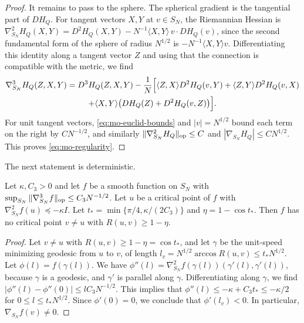 \begin{proof}
It remains to pass to the sphere. The spherical gradient is the tangential part of $DH_Q$. For tangent vectors $X,Y$ at $v\in S_N$, the Riemannian Hessian is $\nabla_{S_N}^2H_Q(X,Y)=D^2H_Q(X,Y)-N^{-1}\langle X,Y\rangle\,v\cdot DH_Q(v)$, since the second fundamental form of the sphere of radius $N^{1/2}$ is $-N^{-1}\langle X,Y\rangle v$. Differentiating this identity along a tangent vector $Z$ and using that the connection is compatible with the metric, we find
\begin{multline*}
\nabla_{S_N}^3H_Q(Z,X,Y)=D^3H_Q(Z,X,Y)-\frac1N\Bigl[\langle Z,X\rangle D^2H_Q(v,Y)+\langle Z,Y\rangle D^2H_Q(v,X)\\
+\langle X,Y\rangle\bigl(DH_Q(Z)+D^2H_Q(v,Z)\bigr)\Bigr].
\end{multline*}
For unit tangent vectors, \eqref{eq:mo-euclid-bounds} and $|v|=N^{1/2}$ bound each term on the right by $CN^{-1/2}$, and similarly $\|\nabla_{S_N}^2H_Q\|_{\rm op}\le C$ and $|\nabla_{S_N}H_Q|\le CN^{1/2}$. This proves \eqref{eq:mo-regularity}.
\end{proof}

The next statement is deterministic.

\begin{lemma}\label{lem:mo-geodesic}
Let $\kappa,C_3>0$ and let $f$ be a smooth function on $S_N$ with $\sup_{S_N}\|\nabla_{S_N}^3f\|_{\rm op}\le C_3N^{-1/2}$. Let $u$ be a critical point of $f$ with $\nabla_{S_N}^2f(u)\preceq-\kappa I$. Let $t_*=\min\{\pi/4,\kappa/(2C_3)\}$ and $\eta=1-\cos t_*$. Then $f$ has no critical point $v\ne u$ with $R(u,v)\ge1-\eta$.
\end{lemma}

\begin{proof}
Let $v\ne u$ with $R(u,v)\ge1-\eta=\cos t_*$, and let $\gamma$ be the unit-speed minimizing geodesic from $u$ to $v$, of length $l_v=N^{1/2}\arccos R(u,v)\le t_*N^{1/2}$. Let $\phi(l)=f(\gamma(l))$. We have $\phi''(l)=\nabla_{S_N}^2f(\gamma(l))(\gamma'(l),\gamma'(l))$, because $\gamma$ is a geodesic, and $\gamma'$ is parallel along $\gamma$. Differentiating along $\gamma$, we find $|\phi''(l)-\phi''(0)|\le lC_3N^{-1/2}$. This implies that $\phi''(l)\le-\kappa+C_3t_*\le-\kappa/2$ for $0\le l\le t_*N^{1/2}$. Since $\phi'(0)=0$, we conclude that $\phi'(l_v)<0$. In particular, $\nabla_{S_N}f(v)\ne0$.
\end{proof}

